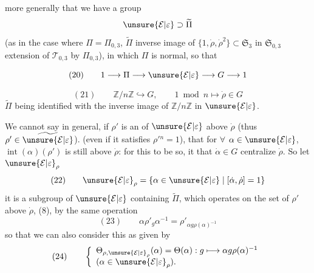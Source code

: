  more generally that we have a group
\[
\unsure{\mathcal E|\varepsilon}\supset\widetilde\Pi
\]
(as in the  case where $\Pi=\Pi_{0,3}$, $\widetilde\Pi$ inverse image of $\{1,\dot\rho,\dot\rho^2\}\subset\mathfrak S_3$ in $\mathfrak S_{0,3}$ extension of $\mathcal T_{0,3}$ by $\Pi_{0,3}$), in which $\Pi$ is normal, so that 



\[
(20)\qquad 1\longrightarrow\Pi\longrightarrow\unsure{\mathcal E|\varepsilon}\longrightarrow G\longrightarrow1
\]


\[
(21)\qquad \mathbb Z/n\mathbb Z\hookrightarrow G,\qquad
1\bmod n\longmapsto\dot\rho\in G
\]
$\widetilde\Pi$ being identified with the inverse image of $\mathbb Z/n\mathbb Z$ in $\unsure{\mathcal E|\varepsilon}$.

We cannot say in general, if $\rho'$ is an  of $\unsure{\mathcal E|\varepsilon}$ above $\dot\rho$ (thus $\rho'\in\widetilde{\unsure{\mathcal E|\varepsilon}}$).
(even if it satisfies $\rho'{}^n=1$), that for $\forall$ $\alpha\in\unsure{\mathcal E|\varepsilon}$, $\operatorname{int}(\alpha)(\rho')$ is still above $\dot\rho$:
for this to be so, it  that $\dot\alpha\in G$ centralize $\dot\rho$. So let $\unsure{\mathcal E|\varepsilon}_\rho$
\[
(22)\qquad
\unsure{\mathcal E|\varepsilon}_\rho=\{\alpha\in\unsure{\mathcal E|\varepsilon}\mid[\dot\alpha,\dot\rho]=1\}
\]
it is a subgroup of $\unsure{\mathcal E|\varepsilon}$ containing $\widetilde\Pi$, which
 operates on the set of  $\rho'$ above $\dot\rho$,
 (8),  by the same operation
\[
(23)\qquad
\alpha\rho'_g\alpha^{-1}=\rho'_{\alpha g\rho(\alpha)^{-1}}
\]
so that we can also consider this  as given by
\[
(24)\qquad
\left\{
\begin{array}{l}
\Theta_{\rho,\unsure{\mathcal E|\varepsilon}_\rho}(\alpha)=\Theta(\alpha):
g\longmapsto\alpha g\rho(\alpha)^{-1}\\
(\alpha\in\unsure{\mathcal E|\varepsilon}_\rho).
\end{array}
\right.
\]


